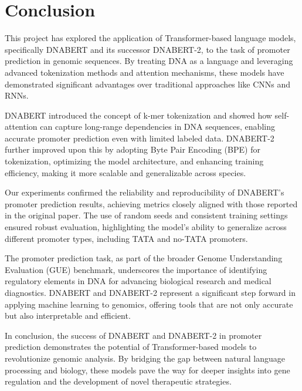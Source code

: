\section{Conclusion}

This project has explored the application of Transformer-based language models, specifically DNABERT and its successor DNABERT-2, to the task of promoter prediction in genomic sequences. By treating DNA as a language and leveraging advanced tokenization methods and attention mechanisms, these models have demonstrated significant advantages over traditional approaches like CNNs and RNNs.

DNABERT introduced the concept of k-mer tokenization and showed how self-attention can capture long-range dependencies in DNA sequences, enabling accurate promoter prediction even with limited labeled data. DNABERT-2 further improved upon this by adopting Byte Pair Encoding (BPE) for tokenization, optimizing the model architecture, and enhancing training efficiency, making it more scalable and generalizable across species.

Our experiments confirmed the reliability and reproducibility of DNABERT's promoter prediction results, achieving metrics closely aligned with those reported in the original paper. The use of random seeds and consistent training settings ensured robust evaluation, highlighting the model's ability to generalize across different promoter types, including TATA and no-TATA promoters.

The promoter prediction task, as part of the broader Genome Understanding Evaluation (GUE) benchmark, underscores the importance of identifying regulatory elements in DNA for advancing biological research and medical diagnostics. DNABERT and DNABERT-2 represent a significant step forward in applying machine learning to genomics, offering tools that are not only accurate but also interpretable and efficient.

In conclusion, the success of DNABERT and DNABERT-2 in promoter prediction demonstrates the potential of Transformer-based models to revolutionize genomic analysis. By bridging the gap between natural language processing and biology, these models pave the way for deeper insights into gene regulation and the development of novel therapeutic strategies.

